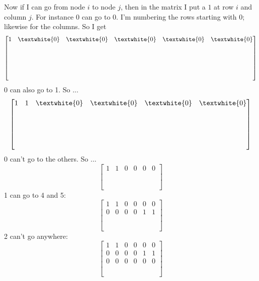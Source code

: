 Now if I can go from node $i$ to node $j$, then in the matrix
I put a $1$ at row $i$ and column $j$.
For instance $0$ can go to $0$.
I'm numbering the rows starting with $0$; likewise for the columns.
So I get
\[
\begin{bmatrix}
  1 & \textwhite{0} & \textwhite{0}& \textwhite{0}& \textwhite{0}& \textwhite{0}\\
    & & & & & \\
    & & & & & \\
    & & & & & \\
    & & & & & \\
    & & & & & \\
\end{bmatrix} 
\]
0 can also go to 1. So ...
\[
\begin{bmatrix}
  1 & 1 & \textwhite{0}& \textwhite{0}& \textwhite{0}& \textwhite{0}\\
    & & & & & \\
    & & & & & \\
    & & & & & \\
    & & & & & \\
    & & & & & \\
\end{bmatrix} 
\]
0 can't go to the others.
So ...
\[
\begin{bmatrix}
  1 & 1 & 0 & 0 & 0 & 0 \\
    & & & & & \\
    & & & & & \\
    & & & & & \\
    & & & & & \\
    & & & & & \\
\end{bmatrix} 
\]
1 can go to 4 and 5:
\[
\begin{bmatrix}
  1 & 1 & 0 & 0 & 0 & 0 \\
  0 & 0 & 0 & 0 & 1 & 1 \\
    & & & & & \\
    & & & & & \\
    & & & & & \\
    & & & & & \\
\end{bmatrix} 
\]
2 can't go anywhere:
\[
\begin{bmatrix}
  1 & 1 & 0 & 0 & 0 & 0 \\
  0 & 0 & 0 & 0 & 1 & 1 \\
  0 & 0 & 0 & 0 & 0 & 0 \\
    & & & & & \\
    & & & & & \\
    & & & & & \\
\end{bmatrix} 
\]
